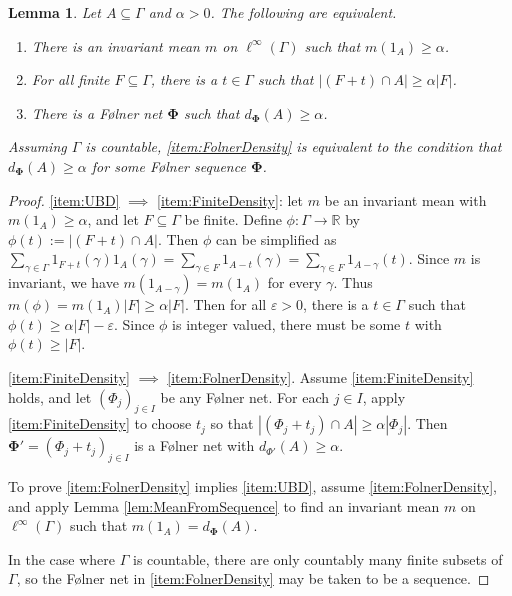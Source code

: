 \documentclass[12pt]{amsart} \usepackage{amsmath,centernot,amssymb,leftindex}
\newcommand{\mb}{\mathbf}
\newtheorem{lemma}[theorem]{Lemma}
\numberwithin{theorem}{section}
\numberwithin{equation}{section}
\theoremstyle{definition}
\begin{document}
	

	
	
	\begin{lemma}\label{lem:UBDequivalents}
		Let $A\subseteq \Gamma$ and $\alpha>0$.  The following are equivalent.
		
		\begin{enumerate}
			\item\label{item:UBD} There is an invariant mean $m$ on $\ell^\infty(\Gamma)$ such that $m(1_A)\geq \alpha$.
			\item\label{item:FiniteDensity} For all finite $F\subseteq \Gamma$, there is a $t\in \Gamma$ such that $|(F+t)\cap A|\geq \alpha|F|$.
			\item\label{item:FolnerDensity} There is a F{\o}lner net $\mb \Phi$ such that $d_{\mb \Phi}(A)\geq \alpha$.
		\end{enumerate}
		Assuming $\Gamma$ is countable, \ref{item:FolnerDensity} is equivalent to the condition that $d_{\mb\Phi}(A)\geq \alpha$ for some F{\o}lner sequence $\mb \Phi$.
	\end{lemma}
	
	\begin{proof} \ref{item:UBD} $\implies$ \ref{item:FiniteDensity}: let $m$ be an invariant mean with $m(1_A)\geq \alpha$, and let $F\subseteq \Gamma$ be finite.  Define $\phi:\Gamma\to \mathbb R$ by $\phi(t):= |(F+t)\cap A|$.  Then $\phi$ can be simplified as $\sum_{\gamma\in \Gamma} 1_{F+t}(\gamma)1_A(\gamma)=\sum_{\gamma \in F} 1_{A-t}(\gamma)=\sum_{\gamma\in F} 1_{A-\gamma}(t)$.  Since $m$ is invariant, we have $m(1_{A-\gamma})=m(1_A)$ for every $\gamma$.  Thus $m(\phi)=m(1_A)|F|\geq \alpha |F|$.  Then for all $\varepsilon>0$, there is a $t\in \Gamma$ such that $\phi(t)\geq \alpha |F|-\varepsilon$.  Since $\phi$ is integer valued, there must be some $t$ with $\phi(t)\geq |F|$.
		
		\ref{item:FiniteDensity} $\implies$ \ref{item:FolnerDensity}.  Assume \ref{item:FiniteDensity} holds, and let $(\Phi_j)_{j\in I}$ be any F{\o}lner net.  For each $j\in I$, apply \ref{item:FiniteDensity} to choose $t_j$ so that $|(\Phi_j+t_j)\cap A|\geq \alpha |\Phi_j|$.  Then $\mb \Phi'=(\Phi_j+t_j)_{j\in I}$ is a F{\o}lner net with $d_{\Phi'}(A)\geq \alpha$.
		
		To prove \ref{item:FolnerDensity} implies \ref{item:UBD}, assume \ref{item:FolnerDensity}, and apply Lemma \ref{lem:MeanFromSequence} to find an invariant mean $m$ on $\ell^\infty(\Gamma)$ such that $m(1_A)=d_{\mb \Phi}(A)$.
		
		In the case where $\Gamma$ is countable, there are only countably many finite subsets of $\Gamma$, so the F{\o}lner net in \ref{item:FolnerDensity} may be taken to be a sequence.
	\end{proof}
	
\end{document}
